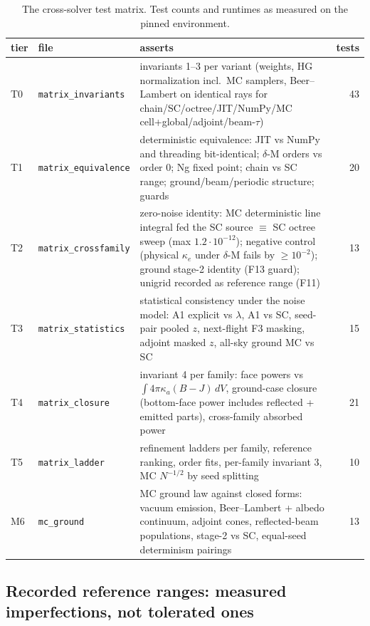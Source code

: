 \documentclass[11pt,a4paper]{article}
\newcommand{\ke}{\kappa_e}
\newcommand{\ka}{\kappa_a}
\begin{document}
\begin{table}[htbp]
\centering\footnotesize
\caption{The cross-solver test matrix. Test counts and runtimes as
measured on the pinned environment.}
\begin{tabular}{@{}l>{\raggedright\arraybackslash}p{3.0cm}>{\raggedright\arraybackslash}p{7.9cm}r@{}}
\toprule
tier & file & asserts & tests \\
\midrule
T0 & \texttt{matrix\_invariants} & invariants 1--3 per variant (weights, HG
normalization incl.\ MC samplers, Beer--Lambert on identical rays for
chain/SC/octree/JIT/NumPy/MC cell+global/adjoint/beam-$\tau$) & 43 \\
T1 & \texttt{matrix\_equivalence} & deterministic equivalence: JIT vs NumPy
and threading bit-identical; $\delta$-M orders vs order 0; Ng fixed point;
chain vs SC range; ground/beam/periodic structure; guards & 20 \\
T2 & \texttt{matrix\_crossfamily} & zero-noise identity: MC deterministic
line integral fed the SC source $\equiv$ SC octree sweep (max $1.2\cdot
10^{-12}$); negative control (physical $\ke$ under $\delta$-M fails by
$\ge10^{-2}$); ground stage-2 identity (F13 guard); unigrid recorded as
reference range (F11) & 13 \\
T3 & \texttt{matrix\_statistics} & statistical consistency under the noise
model: A1 explicit vs $\lambda$, A1 vs SC, seed-pair pooled $z$,
next-flight F3 masking, adjoint masked $z$, all-sky ground MC vs SC & 15 \\
T4 & \texttt{matrix\_closure} & invariant 4 per family: face powers vs
$\int4\pi\ka(B-J)\,dV$, ground-case closure (bottom-face power includes
reflected + emitted parts), cross-family absorbed power & 21 \\
T5 & \texttt{matrix\_ladder} & refinement ladders per family, reference
ranking, order fits, per-family invariant 3, MC $N^{-1/2}$ by seed splitting
& 10 \\
M6 & \texttt{mc\_ground} & MC ground law against closed forms: vacuum
emission, Beer--Lambert + albedo continuum, adjoint cones, reflected-beam
populations, stage-2 vs SC, equal-seed determinism pairings & 13 \\
\bottomrule
\end{tabular}
\end{table}

\subsection{Recorded reference ranges: measured imperfections, not tolerated ones}
\end{document}
